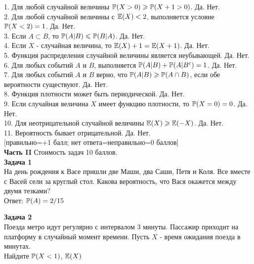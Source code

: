 \documentclass[12pt, a4paper]{article}\usepackage[]{graphicx}\usepackage[]{color}
\begin{document}
	1. Для любой случайной величины $\P(X>0)\ge \P(X+1>0)$. Да. Нет. \\

	2. Для любой случайной величины с $\E(X)<2$, выполняется условие $\P(X<2)=1$. Да. Нет. \\

	3. Если $A\subset B$, то $\P(A|B)\le \P(B|A)$. Да. Нет. \\

	4. Если  $X$  - случайная величина, то $\E(X)+1=\E(X+1)$. Да. Нет. \\

	5. Функция распределения случайной величины является неубывающей. Да. Нет. \\

	6. Для любых событий $A$ и $B$, выполняется $\P(A|B)+\P(A|B^{c})=1$. Да. Нет. \\

	7. Для любых событий  $A$  и  $B$  верно, что $\P(A|B)\ge \P(A\cap
	B)$, если обе вероятности существуют. Да. Нет. \\

	8. Функция плотности может быть периодической. Да. Нет. \\

	9. Если случайная величина $X$ имеет функцию плотности, то $\P(X=0)=0$. Да. Нет. \\

	10. Для неотрицательной случайной величины $\E(X)\ge \E(-X)$. Да.
	Нет. \\

	11. Вероятность бывает отрицательной. Да. Нет. \\


	$[$правильно=+1 балл; нет ответа=неправильно=0 баллов$]$ \\



	\textbf{Часть II} Стоимость задач 10 баллов. \\


	\textbf{Задача 1} \\ %
	На день рождения к Васе пришли две Маши, два Саши, Петя и Коля. Все вместе с Васей сели за круглый стол. Какова вероятность, что Вася окажется между двумя тезками? \\

	Ответ: $\P(A)=2/15$

	\textbf{Задача 2} \\ %
	Поезда метро идут регулярно с интервалом 3 минуты. Пассажир
	приходит на платформу в случайный момент времени. Пусть $X$ -
	время ожидания поезда в минутах. \\
	Найдите $\P(X<1)$, $\E(X)$ \\
\end{document}

